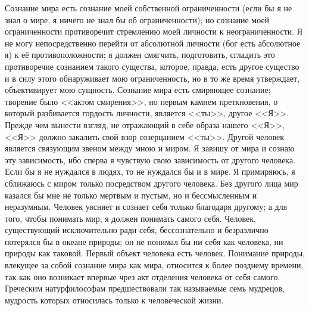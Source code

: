 \documentclass[12pt,oneside]{book}
\begin{document}
Сознание мира есть сознание моей собственной ограниченности (если бы я не знал о мире, я ничего не знал бы об ограниченности); но сознание моей ограниченности противоречит стремлению моей личности к неограниченности. Я не могу непосредственно перейти от абсолютной личности (бог есть абсолютное я) к её противоположности; я должен смягчить, подготовить, сгладить это противоречие сознанием такого существа, которое, правда, есть другое существо и в силу этого обнаруживает мою ограниченность, но в то же время утверждает, объективирует мою сущность. Сознание мира есть смиряющее сознание; творение было <<актом смирения>>, но первым камнем преткновения, о который разбивается гордость личности, является <<ты>>, другое <<Я>>. Прежде чем вынести взгляд, не отражающий в себе образа нашего <<Я>>, <<Я>> должно закалить свой взор созерцанием <<ты>>. Другой человек является связующим звеном между мною и миром. Я завишу от мира и сознаю эту зависимость, ибо сперва я чувствую свою зависимость от другого человека. Если бы я не нуждался в людях, то не нуждался бы и в мире. Я примиряюсь, я сближаюсь с миром только посредством другого человека. Без другого лица мир казался бы мне не только мертвым и пустым, но и бессмысленным и неразумным. Человек уясняет и сознает себя только благодаря другому; а для того, чтобы понимать мир, я должен понимать самого себя. Человек, существующий исключительно ради себя, бессознательно и безразлично потерялся бы в океане природы; он не понимал бы ни себя как человека, ни природы как таковой. Первый объект человека есть человек. Понимание природы, влекущее за собой сознание мира как мира, относится к более позднему времени, так как оно возникает впервые чрез акт отделения человека от себя самого. Греческим натурфилософам предшествовали так называемые семь мудрецов, мудрость которых относилась только к человеческой жизни.
\end{document}
